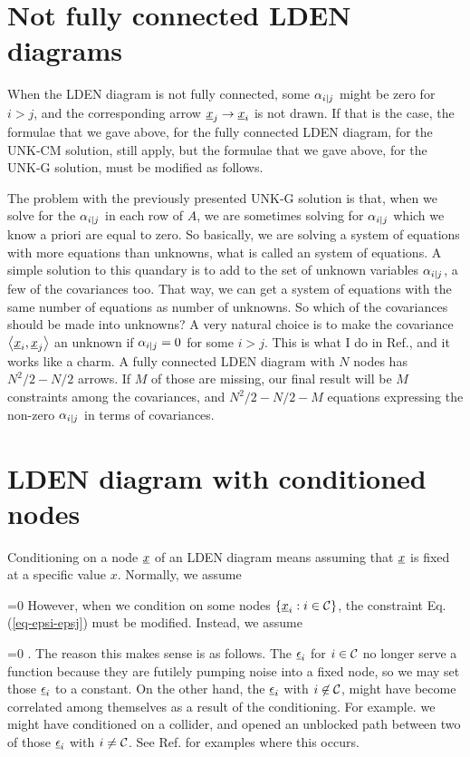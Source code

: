 \section{Not fully connected LDEN diagrams}

When the LDEN diagram is not
fully connected, some $\alpha_{i|j}$
might be zero for $i>j$, and the
corresponding arrow $\rvx_j\rarrow\rvx_i$
is not drawn. If that is the case,
the formulae that we gave above,
for the fully connected LDEN diagram,
for the UNK-CM solution, still apply,
but the formulae that we gave above, for the UNK-G solution,
must be modified as follows.

The problem with the previously
presented UNK-G solution is that,
when we solve for the $\alpha_{i|j}$
in each row of $A$,
we are sometimes solving for $\alpha_{i|j}$
which we know a priori are equal to zero.
So basically, we are solving a system of equations with more equations than unknowns,
what is called an  system
of equations. A simple solution
to this quandary is to add to the set
of unknown variables $\alpha_{i|j}$,
a few of the covariances too.
That way, we can get a system
of equations with the same number of
equations as number of unknowns.
So which of the covariances
should be made into unknowns?
A very natural choice
is to make the covariance $\av{\rvx_i, \rvx_j}$
an unknown if $\alpha_{i|j}=0$
for some $i>j$.
This is what I do in Ref.\cite{scumpy},
and it works like a charm.
A fully connected LDEN diagram with $N$ nodes
has $N^2/2-N/2$ arrows. If $M$ of those are 
missing, our final result 
will be $M$ constraints among the 
covariances, and $N^2/2-N/2 - M$
equations expressing the non-zero $\alpha_{i|j}$
in terms of covariances.


\section{LDEN diagram with conditioned nodes}

Conditioning on a node $\rvx$ 
of an LDEN diagram means assuming that $\rvx$  is
fixed at a specific value $x$.
Normally, we assume 

\beq
{}=0
\quad{}
\label{eq-epsi-epsj}
\eeq
However, when we condition on some nodes $\{\rvx_i: i\in \calc\}$, the constraint
Eq.(\ref{eq-epsi-epsj}) must be modified. Instead, we assume

 \beq{}=0
 \quad {}.
 \eeq
 The reason this makes sense is as follows.
 The $\rveps_i$ for $i\in {\cal C}$
 no longer serve a function because 
 they are futilely pumping noise into a fixed node,
 so we may set those $\rveps_i$ to a constant. 
 On the other hand,
 the  $\rveps_i$ with $i \not \in {\cal C}$, might have become correlated among themselves
 as a result  of the conditioning.
 For example.
  we might have conditioned on a collider, and opened an unblocked path between two of those $\rveps_i$ with $i\neq {\cal C}$. 
See Ref.\cite{scumpy}
for examples where this occurs.

